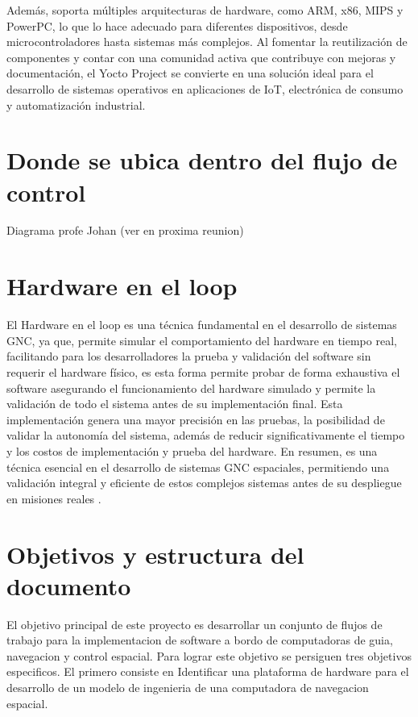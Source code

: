 Además, soporta múltiples arquitecturas de hardware, como ARM, x86, MIPS y PowerPC, lo que lo hace adecuado para diferentes 
dispositivos, desde microcontroladores hasta sistemas más complejos. Al fomentar la reutilización de componentes y contar con 
una comunidad activa que contribuye con mejoras y documentación, el Yocto Project se convierte en una solución ideal para el 
desarrollo de sistemas operativos en aplicaciones de IoT, electrónica de consumo y automatización industrial. \cite{vaduva2015learning}

\section{Donde se ubica dentro del flujo de control}
Diagrama profe Johan (ver en proxima reunion)

\section{Hardware en el loop}
El Hardware en el loop es una técnica fundamental en el desarrollo de sistemas GNC, ya que, permite 
simular el comportamiento del hardware en tiempo real, facilitando para los desarrolladores la 
prueba y validación del software sin requerir el hardware físico, es esta forma permite probar 
de forma exhaustiva el software asegurando el funcionamiento del hardware simulado y permite la 
validación de todo el sistema antes de su implementación final. Esta implementación genera una 
mayor precisión en las pruebas, la posibilidad de validar la autonomía del sistema, además de 
reducir significativamente el tiempo y los costos de implementación y prueba del hardware. En 
resumen, es una técnica esencial en el desarrollo de sistemas GNC espaciales, permitiendo una 
validación integral y eficiente de estos complejos sistemas antes de su despliegue en misiones 
reales \cite{mihalivc2022hardware} \cite{montoya2020advanced}.




\section{Objetivos y estructura del documento}


El objetivo principal de este proyecto es desarrollar un conjunto de flujos de trabajo para la implementacion de software a bordo de
computadoras de guia, navegacion y control espacial. Para lograr este objetivo se persiguen tres objetivos
especificos. El primero consiste en Identificar una plataforma de hardware para el desarrollo de un modelo de ingenieria de
una computadora de navegacion espacial.

